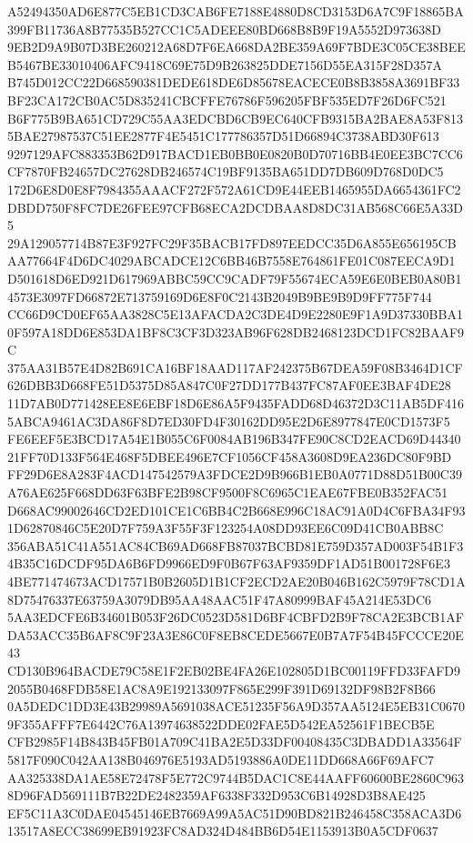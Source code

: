 \documentclass[UTF8,fontset=fandol,zihao=-4,a4paper]{ctexart}
\begin{document}
{{A52494350AD6E877C5EB1CD3CAB6FE7188E4880D8CD3153D6A7C9F18865BA399FB11736A8B77535B527CC1C5ADEEE80BD668B8B9F19A5552D973638D
9EB2D9A9B07D3BE260212A68D7F6EA668DA2BE359A69F7BDE3C05CE38BEEB5467BE33010406AFC9418C69E75D9B263825DDE7156D55EA315F28D357A
B745D012CC22D668590381DEDE618DE6D85678EACECE0B8B3858A3691BF33BF23CA172CB0AC5D835241CBCFFE76786F596205FBF535ED7F26D6FC521
B6F775B9BA651CD729C55AA3EDCBD6CB9EC640CFB9315BA2BAE8A53F8135BAE27987537C51EE2877F4E5451C177786357D51D66894C3738ABD30F613
9297129AFC883353B62D917BACD1EB0BB0E0820B0D70716BB4E0EE3BC7CC6CF7870FB24657DC27628DB246574C19BF9135BA651DD7DB609D768D0DC5
172D6E8D0E8F7984355AAACF272F572A61CD9E44EEB1465955DA6654361FC2DBDD750F8FC7DE26FEE97CFB68ECA2DCDBAA8D8DC31AB568C66E5A33D5
29A129057714B87E3F927FC29F35BACB17FD897EEDCC35D6A855E656195CBAA77664F4D6DC4029ABCADCE12C6BB46B7558E764861FE01C087EECA9D1
D501618D6ED921D617969ABBC59CC9CADF79F55674ECA59E6E0BEB0A80B14573E3097FD66872E713759169D6E8F0C2143B2049B9BE9B9D9FF775F744
CC66D9CD0EF65AA3828C5E13AFACDA2C3DE4D9E2280E9F1A9D37330BBA10F597A18DD6E853DA1BF8C3CF3D323AB96F628DB2468123DCD1FC82BAAF9C
375AA31B57E4D82B691CA16BF18AAD117AF242375B67DEA59F08B3464D1CF626DBB3D668FE51D5375D85A847C0F27DD177B437FC87AF0EE3BAF4DE28
11D7AB0D771428EE8E6EBF18D6E86A5F9435FADD68D46372D3C11AB5DF4165ABCA9461AC3DA86F8D7ED30FD4F30162DD95E2D6E8977847E0CD1573F5
FE6EEF5E3BCD17A54E1B055C6F0084AB196B347FE90C8CD2EACD69D4434021FF70D133F564E468F5DBEE496E7CF1056CF458A3608D9EA236DC80F9BD
FF29D6E8A283F4ACD147542579A3FDCE2D9B966B1EB0A0771D88D51B00C39A76AE625F668DD63F63BFE2B98CF9500F8C6965C1EAE67FBE0B352FAC51
D668AC99002646CD2ED101CE1C6BB4C2B668E996C18AC91A0D4C6FBA34F931D62870846C5E20D7F759A3F55F3F123254A08DD93EE6C09D41CB0ABB8C
356ABA51C41A551AC84CB69AD668FB87037BCBD81E759D357AD003F54B1F34B35C16DCDF95DA6B6FD9966ED9F0B67F63AF9359DF1AD51B001728F6E3
4BE771474673ACD17571B0B2605D1B1CF2ECD2AE20B046B162C5979F78CD1A8D75476337E63759A3079DB95AA48AAC51F47A80999BAF45A214E53DC6
5AA3EDCFE6B34601B053F26DC0523D581D6BF4CBFD2B9F78CA2E3BCB1AFDA53ACC35B6AF8C9F23A3E86C0F8EB8CEDE5667E0B7A7F54B45FCCCE20E43
CD130B964BACDE79C58E1F2EB02BE4FA26E102805D1BC00119FFD33FAFD92055B0468FDB58E1AC8A9E192133097F865E299F391D69132DF98B2F8B66
0A5DEDC1DD3E43B29989A5691038ACE51235F56A9D357AA5124E5EB31C06709F355AFFF7E6442C76A13974638522DDE02FAE5D542EA52561F1BECB5E
CFB2985F14B843B45FB01A709C41BA2E5D33DF00408435C3DBADD1A33564F5817F090C042AA138B046976E5193AD5193886A0DE11DD668A66F69AFC7
AA325338DA1AE58E72478F5E772C9744B5DAC1C8E44AAFF60600BE2860C9638D96FAD569111B7B22DE2482359AF6338F332D953C6B14928D3B8AE425
EF5C11A3C0DAE04545146EB7669A99A5AC51D90BD821B246458C358ACA3D613517A8ECC38699EB91923FC8AD324D484BB6D54E1153913B0A5CDF0637
}}
\end{document}
